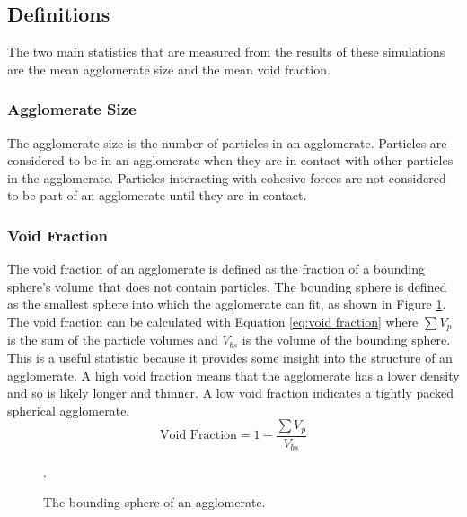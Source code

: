 \documentclass[a4paper,11pt,titlepage]{report}
\begin{document}
\subsection{Definitions}
The two main statistics that are measured from the results of these simulations are the mean agglomerate size and the mean void fraction.
\subsubsection{Agglomerate Size}
The agglomerate size is the number of particles in an agglomerate. Particles are considered to be in an agglomerate when they are in contact with other particles in the agglomerate. Particles interacting with cohesive forces are not considered to be part of an agglomerate until they are in contact.
\subsubsection{Void Fraction}
The void fraction of an agglomerate is defined as the fraction of a bounding sphere's volume that does not contain particles. The bounding sphere is defined as the smallest sphere into which the agglomerate can fit, as shown in Figure \ref{fig:bounding sphere}. The void fraction can be calculated with Equation \ref{eq:void fraction} where $\sum V_{p}$ is the sum of the particle volumes and $V_{bs}$ is the volume of the bounding sphere. This is a useful statistic because it provides some insight into the structure of an agglomerate. A high void fraction means that the agglomerate has a lower density and so is likely longer and thinner. A low void fraction indicates a tightly packed spherical agglomerate.
\begin{equation}
\text{Void Fraction} = 1 - \dfrac{\sum V_{p}}{V_{bs}}
\label{eq:void fraction}
\end{equation}
\begin{figure}[!htb]
\centering

\caption{The bounding sphere of an agglomerate.}
\label{fig:bounding sphere}.
\end{figure}
\end{document}
